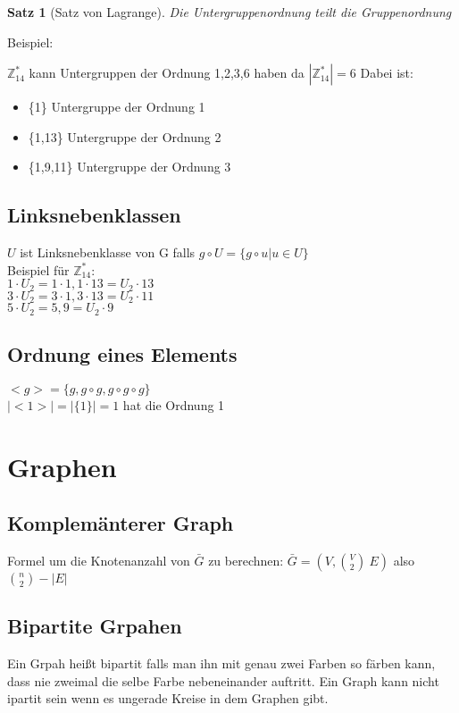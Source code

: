 \documentclass[12pt, letterpaper, twoside]{article}
\newtheorem{theorem}{Satz}[section]
\newcommand{\compl}[1]{\bar{#1}}
\begin{document}
\begin{theorem}[Satz von Lagrange] Die Untergruppenordnung teilt die Gruppenordnung\end{theorem}

Beispiel:

$\mathbb{Z}_{14}^* $ kann Untergruppen der Ordnung 1,2,3,6 haben da $ |\mathbb{Z}_{14}^*| = 6 $
Dabei ist:
\begin{itemize}
	\item \{1\} Untergruppe der Ordnung  1
	\item \{1,13\} Untergruppe der Ordnung 2
	\item \{1,9,11\} Untergruppe der Ordnung 3
\end{itemize}

\subsection{Linksnebenklassen}

$U$ ist Linksnebenklasse von G falls $g \circ U = \{g\circ u | u \in U\}$ \\
\indent
Beispiel für $\mathbb{Z}_{14}^* $:\\
\indent
$1 \cdot U_2 = {1\cdot1,1\cdot13} = U_2 \cdot 13$\\
\indent
$3 \cdot U_2 = {3\cdot1,3\cdot13} = U_2 \cdot 11$\\
\indent
$5 \cdot U_2 = {5,9} = U_2 \cdot 9$\\

\subsection{Ordnung eines Elements}
$<g> = \{g, g \circ g, g\circ g \circ g\}$\\
$|<1>| = | \{1\} |= 1$   hat die Ordnung 1

\section{Graphen}

\subsection{Komplemänterer Graph}
Formel um die Knotenanzahl von $ \compl{G} $ zu berechnen: $ \compl{G} = (V, \binom{V}{2} \ E )$ also $\binom{n}{2} - |E|$


\subsection{Bipartite Grpahen}
Ein Grpah heißt bipartit falls man ihn mit genau zwei Farben so färben kann, dass nie zweimal die selbe Farbe nebeneinander auftritt.
Ein Graph kann nicht ipartit sein wenn es ungerade Kreise in dem Graphen gibt.
\end{document}
